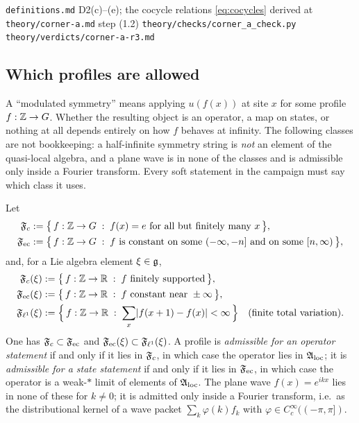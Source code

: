 %
{\texttt{definitions.md} D2(c)--(e); the cocycle relations
 \eqref{eq:cocycles} derived at \texttt{theory/corner-a.md} step (1.2)}%
{\texttt{theory/checks/corner\_a\_check.py}}%
{\texttt{theory/verdicts/corner-a-r3.md}}

\subsection{Which profiles are allowed}

A ``modulated symmetry'' means applying $u(f(x))$ at site $x$ for some profile
$f : \mathbb{Z} \to G$. Whether the resulting object is an operator, a map on states,
or nothing at all depends entirely on how $f$ behaves at infinity. The
following classes are not bookkeeping: a half-infinite symmetry string is
\emph{not} an element of the quasi-local algebra, and a plane wave is in none
of the classes and is admissible only inside a Fourier transform. Every soft
statement in the campaign must say which class it uses.

\begin{definition}
\label{def:admissible-profiles}
Let
\begin{align}
  \mathfrak{F}_{c}  &:= \bigl\{\, f : \mathbb{Z} \to G \;:\; f(x) = e
           \text{ for all but finitely many } x \,\bigr\}, \\
  \mathfrak{F}_{\mathrm{ec}} &:= \bigl\{\, f : \mathbb{Z} \to G \;:\; f \text{ is constant on some }
           (-\infty,-n] \text{ and on some } [n,\infty) \,\bigr\},
\end{align}
and, for a Lie algebra element $\xi \in \mathfrak{g}$,
\begin{align}
  \mathfrak{F}_{c}(\xi)   &:= \bigl\{\, f : \mathbb{Z} \to \mathbb{R} \;:\; f
                 \text{ finitely supported} \,\bigr\}, \\
  \mathfrak{F}_{\mathrm{ec}}(\xi)  &:= \bigl\{\, f : \mathbb{Z} \to \mathbb{R} \;:\; f
                 \text{ constant near } \pm\infty \,\bigr\}, \\
  \mathfrak{F}_{\ell^{1}}(\xi) &:= \Bigl\{\, f : \mathbb{Z} \to \mathbb{R} \;:\;
                 \sum_{x} \lvert f(x+1) - f(x)\rvert < \infty \,\Bigr\}
                 \quad \text{(finite total variation)} .
\end{align}
One has $\mathfrak{F}_{c} \subset \mathfrak{F}_{\mathrm{ec}}$ and $\mathfrak{F}_{\mathrm{ec}}(\xi) \subset \mathfrak{F}_{\ell^{1}}(\xi)$. A profile is
\emph{admissible for an operator statement} if and only if it lies in $\mathfrak{F}_{c}$,
in which case the operator lies in $\mathfrak{A}_{\mathrm{loc}}$; it is \emph{admissible for a state
statement} if and only if it lies in $\mathfrak{F}_{\mathrm{ec}}$, in which case the operator is a
weak-$*$ limit of elements of $\mathfrak{A}_{\mathrm{loc}}$. The plane wave $f(x) = e^{ikx}$ lies in
none of these for $k \neq 0$; it is admitted only inside a Fourier transform,
i.e.\ as the distributional kernel of a wave packet
$\sum_{k} \varphi(k) f_{k}$ with $\varphi \in C_{c}^{\infty}((-\pi,\pi])$.
\end{definition}

